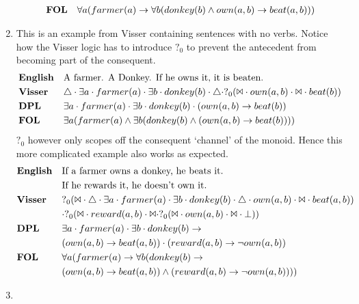 \documentclass[12pt]{article}
\begin{document}
\begin{enumerate}
\begin{align*}
&\text{\textbf{FOL}}&&\forall a(farmer(a) \rightarrow \forall b(donkey(b) \wedge own(a,b) \rightarrow beat(a,b))) \\
\end{align*}
\item
This is an example from Visser \cite{visser1999donkey} containing sentences with no verbs. Notice how the Visser logic has to introduce $?_0$ to prevent the antecedent from becoming part of the consequent.
\begin{align*}
&\text{\textbf{English}}&&\text{A farmer. A Donkey. If he owns it, it is beaten.} \\
&\text{\textbf{Visser}}&&\triangle \cdot \exists a \cdot farmer(a) \cdot \exists b \cdot donkey(b) \cdot \triangle \cdot ?_0(\Bowtie \cdot own(a,b) \cdot \Bowtie \cdot beat(b)) \\
&\text{\textbf{DPL}}&&\exists a \cdot farmer(a) \cdot \exists b \cdot donkey(b) \cdot (own(a,b) \rightarrow beat(b)) \\
&\text{\textbf{FOL}}&&\exists a(farmer(a) \wedge \exists b(donkey(b) \wedge (own(a,b) \rightarrow beat(b)))) \\
\end{align*}
$?_0$ however only scopes off the consequent `channel' of the monoid. Hence this more complicated example also works as expected.
\begin{align*}
&\text{\textbf{English}}&&\text{If a farmer owns a donkey, he beats it.}\\
&&&\text{If he rewards it, he doesn't own it.} \\
&\text{\textbf{Visser}}&&?_0(\Bowtie \cdot \triangle \cdot \exists a \cdot farmer(a) \cdot \exists b \cdot donkey(b) \cdot \triangle \cdot own(a,b) \cdot \Bowtie \cdot beat(a,b))\\&&& \cdot ?_0(\Bowtie \cdot reward(a,b) \cdot \Bowtie \cdot ?_0(\Bowtie \cdot own(a,b) \cdot \Bowtie \cdot \bot)) \\
&\text{\textbf{DPL}}&&\exists a \cdot farmer(a) \cdot \exists b \cdot donkey(b) \rightarrow\\&&& (own(a,b) \rightarrow beat(a,b))\cdot (reward(a,b) \rightarrow \neg own(a,b)) \\
&\text{\textbf{FOL}}&&\forall a(farmer(a) \rightarrow \forall b(donkey(b) \rightarrow\\&&& (own(a,b) \rightarrow beat(a,b))\wedge (reward(a,b) \rightarrow \neg own(a,b)))) \\
\end{align*}
\item

\end{enumerate}
\end{document}
